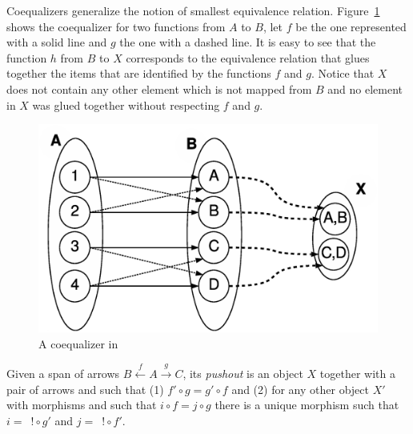 \begin{example} Coequalizers generalize the notion of smallest equivalence relation. Figure~\ref{fig:gts:coequalizer} shows the coequalizer for two functions from $A$ to $B$, let $f$ be the one represented with a solid line and $g$ the one with a dashed line. It is easy to see that the function $h$ from $B$ to $X$ corresponds to the equivalence relation that glues together the items that are identified by the functions $f$ and $g$. Notice that $X$ does not contain any other element which is not mapped from $B$ and no element in $X$ was glued together without respecting $f$ and $g$.

\begin{figure}[!ht]
  \centering
  \includegraphics[scale=0.4]{images/gts/coequalizer}
  \caption{A coequalizer in  }\label{fig:gts:coequalizer}
\end{figure}


\end{example}

\begin{definition}[Pushout] Given a span of arrows \mbox{$B \xleftarrow{f} A \xrightarrow{g} C$}, its \emph{pushout} is an object $X$ together with a pair of arrows  and  such that (1) \mbox{$f' \circ g = g' \circ f$} and (2) for any other object $X'$ with morphisms  and  such that $i \circ f = j \circ g$ there is a unique morphism  such that \mbox{$i =$ $! \circ g'$} and \mbox{$j =$ $! \circ f'$}.


\end{definition}

